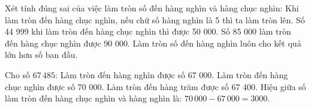 \begin{ex} %
Xét tính đúng sai của việc làm tròn số đến hàng nghìn và hàng chục nghìn:
\choiceTF
{\True Khi làm tròn đến hàng chục nghìn, nếu chữ số hàng nghìn là 5 thì ta làm tròn lên.}
{Số 44 999 khi làm tròn đến hàng chục nghìn thì được 50 000.}
{\True Số 85 000 làm tròn đến hàng chục nghìn được 90 000.}
{Làm tròn số đến hàng nghìn luôn cho kết quả lớn hơn số ban đầu.}
\end{ex}

\begin{ex} %
Cho số $67\,485$:
\choiceTF
{\True Làm tròn đến hàng nghìn được số 67 000.}
{\True Làm tròn đến hàng chục nghìn được số 70 000.}
{Làm tròn đến hàng trăm được số 67 400.}
{\True Hiệu giữa số làm tròn đến hàng chục nghìn và hàng nghìn là: $70\,000 - 67\,000 = 3000$.}
\end{ex}


